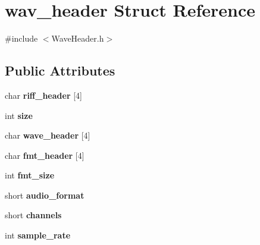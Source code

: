 \hypertarget{structwav__header}{}\section{wav\+\_\+header Struct Reference}
\label{structwav__header}


{\ttfamily \#include $<$Wave\+Header.\+h$>$}

\subsection*{Public Attributes}
\begin{DoxyCompactItemize}
\item 
\mbox{\label{structwav__header_a977b8193bf1f39dbd815c6210f0bb6c6}} 
char {\bfseries riff\+\_\+header} \mbox{[}4\mbox{]}
\item 
\mbox{\label{structwav__header_a3d8d145f19783d500852e93ea5f292d8}} 
int {\bfseries size}
\item 
\mbox{\label{structwav__header_a0dc0cff34ad7fe5e59c5cbcee1640354}} 
char {\bfseries wave\+\_\+header} \mbox{[}4\mbox{]}
\item 
\mbox{\label{structwav__header_a4039d1e8e91d7940aa45a29aad27b4ce}} 
char {\bfseries fmt\+\_\+header} \mbox{[}4\mbox{]}
\item 
\mbox{\label{structwav__header_a92e6134a93f1c2c7d8084fadc7645823}} 
int {\bfseries fmt\+\_\+size}
\item 
\mbox{\label{structwav__header_a94c9ee0387f846c47eb9e97636994d93}} 
short {\bfseries audio\+\_\+format}
\item 
\mbox{\label{structwav__header_a201fbf3b7d39ef8b49b20ace40f82d56}} 
short {\bfseries channels}
\item 
\mbox{\label{structwav__header_a0632019c676aa88f0351c0ab11461de0}} 
int {\bfseries sample\+\_\+rate}
\item 
\mbox{\label{structwav__header_a8330740d45200d6aee4ba54fc0d834d8}} 

\end{DoxyCompactItemize}
